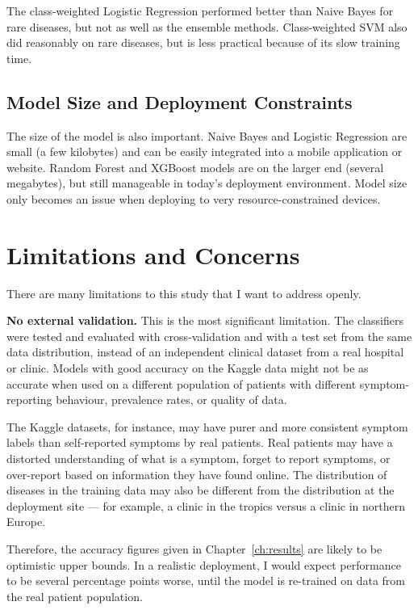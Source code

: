 The class-weighted Logistic Regression performed better than Naive Bayes for rare diseases, but not as well as the ensemble methods. Class-weighted SVM also did reasonably on rare diseases, but is less practical because of its slow training time.

\subsection{Model Size and Deployment Constraints}

The size of the model is also important. Naive Bayes and Logistic Regression are small (a few kilobytes) and can be easily integrated into a mobile application or website. Random Forest and XGBoost models are on the larger end (several megabytes), but still manageable in today's deployment environment. Model size only becomes an issue when deploying to very resource-constrained devices.

\section{Limitations and Concerns}
\label{sec:limitations}

There are many limitations to this study that I want to address openly.

\textbf{No external validation.} This is the most significant limitation. The classifiers were tested and evaluated with cross-validation and with a test set from the same data distribution, instead of an independent clinical dataset from a real hospital or clinic. Models with good accuracy on the Kaggle data might not be as accurate when used on a different population of patients with different symptom-reporting behaviour, prevalence rates, or quality of data.

The Kaggle datasets, for instance, may have purer and more consistent symptom labels than self-reported symptoms by real patients. Real patients may have a distorted understanding of what is a symptom, forget to report symptoms, or over-report based on information they have found online. The distribution of diseases in the training data may also be different from the distribution at the deployment site --- for example, a clinic in the tropics versus a clinic in northern Europe.

Therefore, the accuracy figures given in Chapter~\ref{ch:results} are likely to be optimistic upper bounds. In a realistic deployment, I would expect performance to be several percentage points worse, until the model is re-trained on data from the real patient population.

